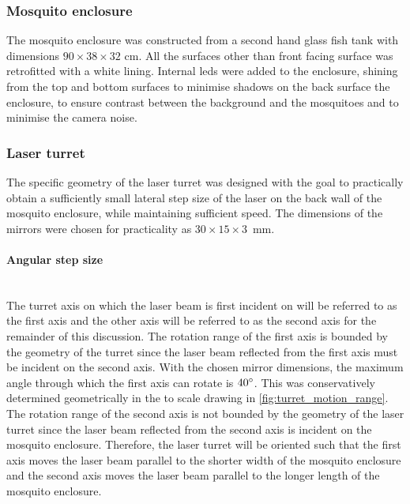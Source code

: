 \subsubsection{Mosquito enclosure}
\newcommand{\enclosureWidthCM}{90} %
\newcommand{\enclosureHeightCM}{38} %
\newcommand{\enclosureDepthCM}{32} %

The mosquito enclosure was constructed from a second hand glass fish tank with dimensions $\enclosureWidthCM \times \enclosureHeightCM \times \enclosureDepthCM$ cm. All the surfaces other than front facing surface was retrofitted with a white lining. Internal \glspl{led} were added to the enclosure, shining from the top and bottom surfaces to minimise shadows on the back surface the enclosure, to ensure contrast between the background and the mosquitoes and to minimise the camera noise.



\subsubsection{Laser turret}
The specific geometry of the laser turret was designed with the goal to practically obtain a sufficiently small lateral step size of the laser on the back wall of the mosquito enclosure, while maintaining sufficient speed. The dimensions of the mirrors were chosen for practicality as $30 \times 15 \times 3$~mm.


\label{par:angular_step_size}
\paragraph{Angular step size}\mbox{}\\
The turret axis on which the laser beam is first incident on will be referred to as the first axis and the other axis will be referred to as the second axis for the remainder of this discussion. The rotation range of the first axis is bounded by the geometry of the turret since the laser beam reflected from the first axis must be incident on the second axis. With the chosen mirror dimensions, the maximum angle through which the first axis can rotate is $40^{\circ}$. This was conservatively determined geometrically in the to scale drawing in \autoref{fig:turret_motion_range}. The rotation range of the second axis is not bounded by the geometry of the laser turret since the laser beam reflected from the second axis is incident on the mosquito enclosure. Therefore, the laser turret will be oriented such that the first axis moves the laser beam parallel to the shorter width of the mosquito enclosure and the second axis moves the laser beam parallel to the longer length of the mosquito enclosure.

